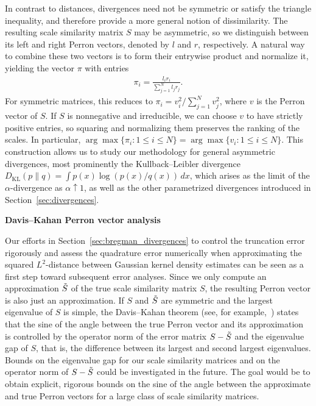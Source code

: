 In contrast to distances, divergences need not be symmetric or satisfy the triangle inequality, and therefore provide a more general notion of dissimilarity. The resulting scale similarity matrix $S$ may be asymmetric, so we distinguish between its left and right Perron vectors, denoted by $l$ and $r$, respectively. A natural way to combine these two vectors is to form their entrywise product and normalize it, yielding the vector $\pi$ with entries
\begin{align*}
    \pi_i=\frac{l_ir_i}{\sum_{j=1}^{N}l_jr_j}.
\end{align*}
For symmetric matrices, this reduces to $\pi_i=v_i^2/\sum_{j=1}^{N}v_j^2$, where $v$ is the Perron vector of $S$. If $S$ is nonnegative and irreducible, we can choose $v$ to have strictly positive entries, so squaring and normalizing them preserves the ranking of the scales. In particular, $\arg\max\{\pi_i:1\le i\le N\}=\arg\max\{v_i:1\le i\le N\}$. This construction allows us to study our methodology for general asymmetric divergences, most prominently the Kullback--Leibler divergence $D_{\text{KL}}(p\|q)=\int p(x)\log{(p(x)/q(x))}\,dx$, which arises as the limit of the $\alpha$-divergence as $\alpha\uparrow1$, as well as the other parametrized divergences introduced in Section~\ref{sec:divergences}.

\textbf{Davis--Kahan Perron vector analysis}

Our efforts in Section~\ref{sec:bregman_divergences} to control the truncation error rigorously and assess the quadrature error numerically when approximating the squared $L^2$-distance between Gaussian kernel density estimates can be seen as a first step toward subsequent error analyses. Since we only compute an approximation $\Tilde{S}$ of the true scale similarity matrix $S$, the resulting Perron vector is also just an approximation. If $S$ and $\Tilde{S}$ are symmetric and the largest eigenvalue of $S$ is simple, the Davis--Kahan theorem (see, for example,~\cite[Corollary~1]{yu_useful_2015}) states that the sine of the angle between the true Perron vector and its approximation is controlled by the operator norm of the error matrix $S-\Tilde{S}$ and the eigenvalue gap of $S$, that is, the difference between its largest and second largest eigenvalues. Bounds on the eigenvalue gap for our scale similarity matrices and on the operator norm of $S-\Tilde{S}$ could be investigated in the future. The goal would be to obtain explicit, rigorous bounds on the sine of the angle between the approximate and true Perron vectors for a large class of scale similarity matrices. 

